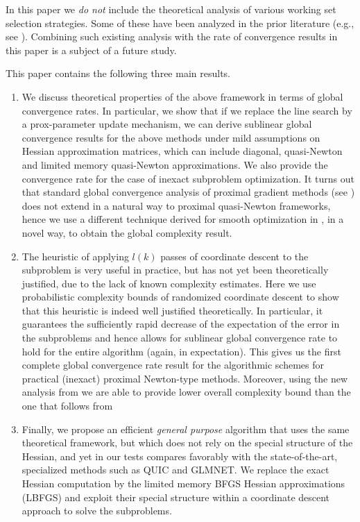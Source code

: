 \documentclass[11pt]{article}
\numberwithin{equation}{section}
\begin{document}
In this paper we {\em do not } include the theoretical analysis of various working set selection strategies. Some of these have been analyzed in the prior literature (e.g., see \cite{LewisWright11}). Combining such existing analysis with the rate of convergence results in this paper is a subject of a future study. 

This paper contains the following  three main results. 
\begin{enumerate}
\item We discuss   theoretical properties of the above framework in terms of global convergence rates.
In particular, we show that if we replace the line search by a prox-parameter update mechanism, we can derive sublinear global convergence results for the above methods under mild assumptions on Hessian approximation matrices, which can include diagonal, quasi-Newton and limited memory quasi-Newton approximations. We also provide the convergence rate for the case of inexact subproblem optimization. 
It turns out that standard global convergence analysis of proximal gradient methods (see \cite{Beck2009,Schmidtetal}) does not extend in a natural way to  proximal
quasi-Newton frameworks, hence we use a different technique derived for smooth optimization in \cite{Nesterov, NesterovPolyak, Cartisetal2012},  in a novel way, to obtain the global complexity result.  

\item The heuristic of applying $l(k)$ passes of coordinate descent to the subproblem is very useful in practice, but has not yet been theoretically justified, due to the lack of known complexity estimates. Here we use probabilistic complexity bounds of randomized coordinate descent to show that this heuristic is indeed  well justified theoretically.
In particular, it guarantees the sufficiently rapid decrease of the expectation of the error in the subproblems  and hence allows for sublinear global convergence rate to hold for the entire algorithm (again, in expectation). This gives us the  first complete global convergence rate result for the algorithmic schemes for  practical (inexact) proximal Newton-type methods. Moreover, using the new analysis from \cite{NesterovConvexBook2004, NesterovPolyak, Cartisetal2012} we are able to provide lower overall complexity
bound than the one that follows from  \cite{Schmidtetal}
\item
Finally, we propose an efficient {\em general purpose} algorithm that uses the same theoretical framework, but  which does not rely on the special structure of the Hessian, and yet in our tests compares favorably with the state-of-the-art, specialized methods such as   QUIC and GLMNET. We replace the exact Hessian computation by the limited memory BFGS Hessian approximations  \cite{NoceWrig06}  (LBFGS) and exploit their special structure within a coordinate descent approach to solve the subproblems.
\end{enumerate}
\end{document}
